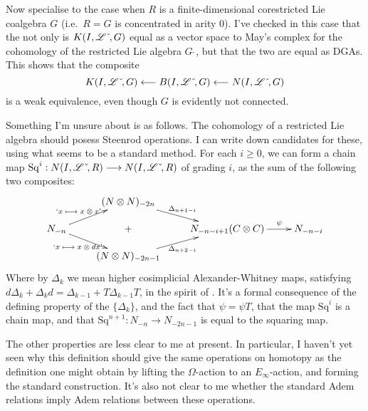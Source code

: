 \documentclass[10pt]{article}
\newcommand{\Sq}{\mathrm{Sq}}
\newcommand{\dual}{\,\check{\,}}
\newcommand{\LieOperad}{\scrL}
\newcommand{\dualLieOperad}{\LieOperad\dual}
\begin{document}
\begin{Corestricted Lie coalgebras Executive Summary}
Now specialise to the case when $R$ is a finite-dimensional corestricted Lie coalgebra $G$ (i.e.\ $R=G$ is concentrated in arity 0). I've checked in this case that the not only is $K(I,\dualLieOperad,G)$ equal as a vector space to May's complex for the cohomology of the restricted Lie algebra $G\dual$, but that the two are equal as DGAs. This shows that the composite
\[K(I,\dualLieOperad,G) \from B(I,\dualLieOperad,G) \from N(I,\dualLieOperad,G)\]
is a weak equivalence, even though $G$ is evidently not connected.

Something I'm unsure about is as follows. The cohomology of a restricted Lie algebra should posess Steenrod operations. I can write down candidates for these, using what seems to be a standard method.
For each $i\geq0$, we can form a chain map $\Sq^{i}:N(I,\dualLieOperad,R)\to N(I,\dualLieOperad,R)$ of grading $i$, as the sum of the following two composites:
\[\xymatrix@R=4mm{
&%
(N\otimes N)_{-2n}
\ar[dr]^-{\Delta_{n+1-i}}
&%
&%
\\%
N_{-n}
\ar[ur]^-{\textup{`$x\mapsto x\otimes x$'}}
\ar[dr]_-{\textup{`$x\mapsto x\otimes dx$'}}&%
+&%
N_{-n-i+1}(C\otimes C)
\ar[r]^-{\psi}
&%
N_{-n-i}\\%
&%
(N\otimes N)_{-2n-1}
\ar[ur]_-{\Delta_{n+2-i}}
&%
&%
}\]
Where by $\Delta_k$ we mean higher cosimplicial Alexander-Whitney maps, satisfying $d\Delta_k+\Delta_k d=\Delta_{k-1}+T\Delta_{k-1}T$, in the spirit of  \cite{DwyerHigherDividedSquares.pdf}.
It's a formal consequence of the defining property of the $\{\Delta_k\}$, and the fact that $\psi=\psi T$, that the map $\Sq^i$ is a chain map, and that $\Sq^{n+1}:N_{-n}\to N_{-2n-1}$ is equal to the squaring map.

The other properties are less clear to me at present. In particular, I haven't yet seen why this definition should give the same operations on homotopy as the definition one might obtain by lifting the $\Omega$-action to an $E_{\infty}$-action, and forming the standard construction. It's also not clear to me whether the standard Adem relations imply Adem relations between these operations.
\end{Corestricted Lie coalgebras Executive Summary}
\end{document}
